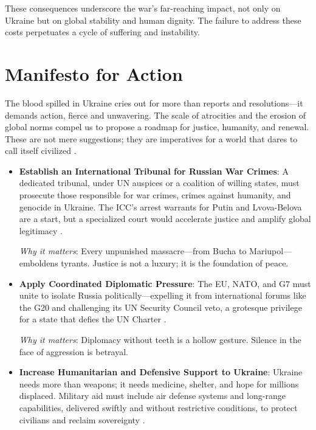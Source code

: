 \documentclass[a4paper,12pt]{article}
\begin{document}
These consequences underscore the war’s far-reaching impact, not only on Ukraine but on global stability and human dignity. The failure to address these costs perpetuates a cycle of suffering and instability.

\section{Manifesto for Action}
The blood spilled in Ukraine cries out for more than reports and resolutions—it demands action, fierce and unwavering. The scale of atrocities and the erosion of global norms compel us to propose a roadmap for justice, humanity, and renewal. These are not mere suggestions; they are imperatives for a world that dares to call itself civilized \cite{icc_2023, un_inquiry_2023}.

\begin{itemize}
    \item \textbf{Establish an International Tribunal for Russian War Crimes}: A dedicated tribunal, under UN auspices or a coalition of willing states, must prosecute those responsible for war crimes, crimes against humanity, and genocide in Ukraine. The ICC’s arrest warrants for Putin and Lvova-Belova are a start, but a specialized court would accelerate justice and amplify global legitimacy \cite{icc_2023}.
    
    \textit{Why it matters}: Every unpunished massacre—from Bucha to Mariupol—emboldens tyrants. Justice is not a luxury; it is the foundation of peace.

    \item \textbf{Apply Coordinated Diplomatic Pressure}: The EU, NATO, and G7 must unite to isolate Russia politically—expelling it from international forums like the G20 and challenging its UN Security Council veto, a grotesque privilege for a state that defies the UN Charter \cite{un_charter}.
    
    \textit{Why it matters}: Diplomacy without teeth is a hollow gesture. Silence in the face of aggression is betrayal.

    \item \textbf{Increase Humanitarian and Defensive Support to Ukraine}: Ukraine needs more than weapons; it needs medicine, shelter, and hope for millions displaced. Military aid must include air defense systems and long-range capabilities, delivered swiftly and without restrictive conditions, to protect civilians and reclaim sovereignty \cite{unhcr_2023}.
    

\end{itemize}
\end{document}
